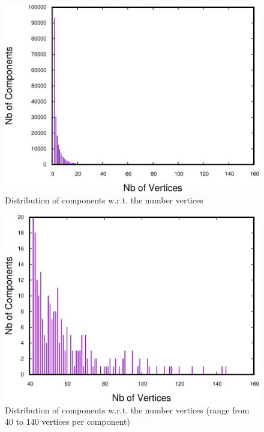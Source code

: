 \begin{figure}
\centering
\includegraphics[scale=0.35]{bench/generated/frequencyall-crop.pdf}
\caption{Distribution of components w.r.t. the number vertices}
\label{fig:vertices-components-all}
\end{figure}

\begin{figure}
\centering
\includegraphics[scale=0.35]{bench/generated/frequency-selected-crop.pdf}
\caption{Distribution of components w.r.t. the number vertices (range from 40 to 140 vertices per component)}
\label{fig:vertices-components-40}
\end{figure}


